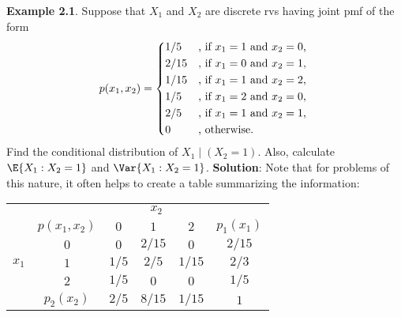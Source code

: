 \begin{Example}
    \textbf{Example 2.1}. Suppose that $ X_1 $ and $ X_2 $ are discrete rvs having joint pmf of the form
    \[ p(x_1,x_2)=\begin{cases*}
            1/5  & , if $ x_1=1 $ and $ x_2=0 $, \\
            2/15 & , if $ x_1=0 $ and $ x_2=1 $, \\
            1/15 & , if $ x_1=1 $ and $ x_2=2 $, \\
            1/5  & , if $ x_1=2 $ and $ x_2=0 $, \\
            2/5  & , if $ x_1=1 $ and $ x_2=1 $, \\
            0    & , otherwise.
        \end{cases*} \]
    Find the conditional distribution of $ X_1\mid (X_2=1) $. Also, calculate $ \E{X_1\given X_2=1} $ and
    $ \Var{X_1\given X_2=1} $.
    \tcblower{}
    \textbf{Solution}: Note that for problems of this nature, it often helps to create a table summarizing the information:
    \begin{center}
        \begin{NiceTabular}{cc|ccc|c}
                           &  &                                                                                                                         \\
             &         & $ 0 $                      & $ 1 $                      & $ 2 $                      &  \\
                       & $ 0 $                       & $ 0 $                      & $ 2/15 $                   & $ 0 $                      & $ 2/15 $                            \\
            & $ 1 $                       & $ 1/5 $                    & $ 2/5 $                    & $ 1/15 $                   & $ 2/3 $                            \\
            & $ 2 $                       & $ 1/5 $                    & $ 0 $                      & $ 0 $                      & $ 1/5 $                            \\
             &    &   &  &  & 

\end{NiceTabular}
\end{center}
\end{Example}
